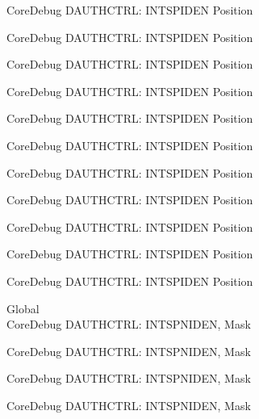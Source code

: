\begin{DoxyRefList}
\label{deprecated__deprecated000437}%
%
Core\+Debug DAUTHCTRL\+: INTSPIDEN Position 

\label{deprecated__deprecated000540}%
%
Core\+Debug DAUTHCTRL\+: INTSPIDEN Position 

\label{deprecated__deprecated000642}%
%
Core\+Debug DAUTHCTRL\+: INTSPIDEN Position 

\label{deprecated__deprecated000767}%
%
Core\+Debug DAUTHCTRL\+: INTSPIDEN Position 

\label{deprecated__deprecated000821}%
%
Core\+Debug DAUTHCTRL\+: INTSPIDEN Position 

\label{deprecated__deprecated000897}%
%
Core\+Debug DAUTHCTRL\+: INTSPIDEN Position 

\label{deprecated__deprecated000960}%
%
Core\+Debug DAUTHCTRL\+: INTSPIDEN Position 

\label{deprecated__deprecated001039}%
%
Core\+Debug DAUTHCTRL\+: INTSPIDEN Position 

\label{deprecated__deprecated001115}%
%
Core\+Debug DAUTHCTRL\+: INTSPIDEN Position 

\label{deprecated__deprecated001218}%
%
Core\+Debug DAUTHCTRL\+: INTSPIDEN Position 

\label{deprecated__deprecated001320}%
%
Core\+Debug DAUTHCTRL\+: INTSPIDEN Position  
\item[Global \doxylink{group___c_m_s_i_s___s_c_b_gadad0bf68d32cba49c1ea7534122c2752}{Core\+Debug\+\_\+\+DAUTHCTRL\+\_\+\+INTSPNIDEN\+\_\+\+Msk} ]\hfill \\
\label{deprecated__deprecated000086}%
%
Core\+Debug DAUTHCTRL\+: INTSPNIDEN, Mask 

\label{deprecated__deprecated000140}%
%
Core\+Debug DAUTHCTRL\+: INTSPNIDEN, Mask 

\label{deprecated__deprecated000216}%
%
Core\+Debug DAUTHCTRL\+: INTSPNIDEN, Mask 

\label{deprecated__deprecated000279}%
%
Core\+Debug DAUTHCTRL\+: INTSPNIDEN, Mask 


\end{DoxyRefList}
